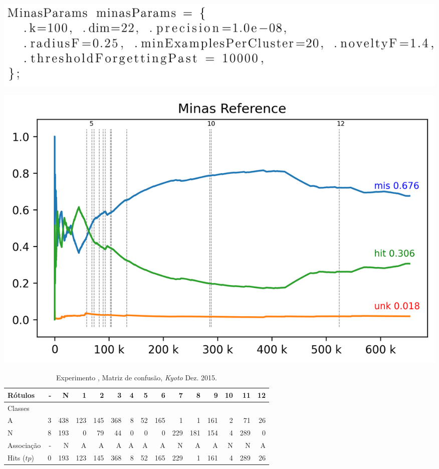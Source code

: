\documentclass[aspectratio=1610,10pt]{beamer}
\begin{document}
\begin{frame}\centering
  \includegraphics[width=1\linewidth]{experiments/params.png}
\end{frame}
\begin{frame}\centering
  \includegraphics[width=1\linewidth]{experiments/revised-java-log.png}
\end{frame}
\begin{frame}
  \footnotesize
  \begin{table}[hbt]
    \centering
    \caption{Experimento \expA, Matriz de confusão, \emph{Kyoto} Dez. 2015.}
    \label{tab:java-matrix}
    \begin{tabular}{l *{14}{|r} }
      Rótulos   &     - &       N &    1 &    2 &    3 &  4 &   5 &    6 &    7 &     8 &    9 &    10 &   11 &  12 \\\hline
      Classes  &       &         &      &      &      &    &     &      &      &       &      &       &      &     \\\hline
      \hline
      A        &  3 &  438 &  123 &  145 &  368 &  8 &  52 &  165 &    1 &  1 &  161 &  2 &   71 &  26 \\\hline
      N        &  8 &  193 &    0 &   79 &   44 &  0 &   0 &    0 &  229 &   181 &  154 &  4 &  289 &   0 \\\hline
      \hline
      Associação &     - &       N &    A &    A &    A &  A &   A &    A &    N &     A &    A &     N &    N &   A \\\hline
      Hits ($tp$)     &     0 &  193 &  123 &  145 &  368 &  8 &  52 &  165 &  229 &  1 &  161 &  4 &  289 &  26 
    \end{tabular}
  \end{table}
\end{frame}
\end{document}
